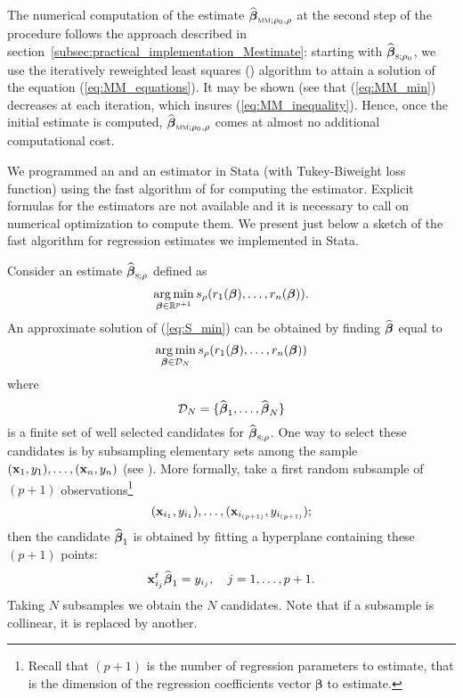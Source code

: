 The numerical computation of the estimate
$\sthat{\boldsymbol\beta}_{\stsc{MM};\rho_{0},\rho}$ at the second step of the
procedure follows the approach described in
section~\ref{subsec:practical_implementation_Mestimate}: starting with
$\sthat{\boldsymbol\beta}_{\stsc{S};\rho_{0}}$, we use the iteratively
reweighted least squares () algorithm to attain a solution of the
equation (\ref{eq:MM_equations}). It may be shown (see
\citet{maronna:etal:2006} that (\ref{eq:MM_min}) decreases at each iteration,
which insures (\ref{eq:MM_inequality}). Hence, once the initial 
estimate is computed, $\sthat{\boldsymbol\beta}_{\stsc{MM};\rho_{0},\rho}$
comes at almost no additional computational cost.

We programmed an  and an  estimator in Stata (with
Tukey-Biweight loss function) using the fast algorithm of
\citet{salibian:yohai:2006} for computing the  estimator. Explicit
formulas for the estimators are not available and it is necessary to call on
numerical optimization to compute them. We present just below a sketch of the
fast algorithm for regression  estimates we implemented in Stata.

Consider an estimate $\sthat{\boldsymbol\beta}_{\stsc{S};\rho}$ defined as
%
\begin{equation}\label{eq:S_min}
    \mathop{\arg\min}_{\boldsymbol\beta\in\mathbb{R}^{p+1}}
    s_{\rho}(r_{1}(\boldsymbol\beta), \dots, r_{n}(\boldsymbol\beta)).
\end{equation}
%
An approximate solution of (\ref{eq:S_min}) can be obtained by finding
$\widehat{\boldsymbol\beta}$ equal to
\[
    \mathop{\arg\min}_{\boldsymbol\beta\in\mathcal{D}_{N}}
    s_{\rho}(r_{1}(\boldsymbol\beta), \dots, r_{n}(\boldsymbol\beta))
\]
where
\[
    \mathcal{D}_{N} = \{\widehat{\boldsymbol\beta}_{1}, \dots, \widehat{\boldsymbol\beta}_{N}\}
\]
is a finite set of well selected candidates for
$\sthat{\boldsymbol\beta}_{\stsc{S};\rho}$. One way to select these candidates
is by subsampling elementary sets among the sample $(\mathbf x_{1}, y_{1}),
\dots, (\mathbf x_{n},y_{n})$ (see \citealp{rousseeuw:1984}). More formally,
take a first random subsample of $(p+1)$ observations\footnote{Recall that
$(p+1)$ is the number of regression parameters to estimate, that is the
dimension of the regression coefficients vector $\boldsymbol\beta$ to estimate.}
\[
    (\mathbf x_{i_{1}}, y_{i_{1}}), \dots, (\mathbf x_{i_{(p+1)}}, y_{i_{(p+1)}});
\]
then the candidate $\widehat{\boldsymbol\beta}_{1}$ is obtained by fitting a
hyperplane containing these $(p+1)$ points:
\[
    \mathbf x_{i_{j}}^t \widehat{\boldsymbol\beta}_{1} = y_{i_j},\quad j = 1, \dots, p+1.
\]
Taking $N$ subsamples we obtain the $N$ candidates. Note that if a subsample
is collinear, it is replaced by another.

